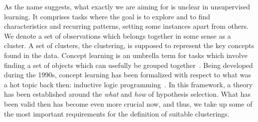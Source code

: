 As the name suggests, what exactly we are aiming for is unclear in unsupervised learning. It comprises tasks where the goal is to explore and to find characteristics and recurring patterns, setting some instances apart from others. We denote a set of observations which belongs together in some sense as a cluster. A set of clusters, the clustering, is supposed to represent the key concepts found in the data. Concept learning is an umbrella term for tasks which involve finding a set of objects which can usefully be grouped together~\citep{morik1993knowledge}. Being developed during the 1990s, concept learning has been formalized with respect to what was a hot topic back then: inductive logic programming~\citep{muggleton1994inductive}. In this framework, a theory has been established around the \emph{what} and \emph{how} of hypothesis selection. What has been valid then has become even more crucial now, and thus, we take up some of the most important requirements for the definition of suitable clusterings. 
